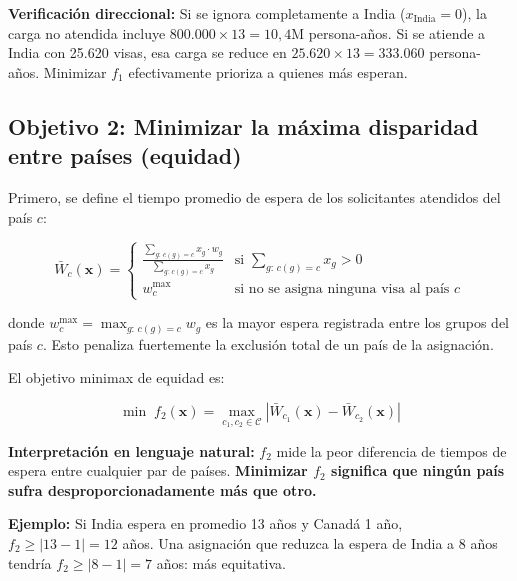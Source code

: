 \documentclass[12pt,letterpaper]{article}
\begin{document}
\textbf{Verificación direccional:} Si se ignora completamente a India ($x_{\text{India}} = 0$), la carga no atendida incluye $800.000 \times 13 = 10{,}4$M persona-años. Si se atiende a India con 25.620 visas, esa carga se reduce en $25.620 \times 13 = 333.060$ persona-años. Minimizar $f_1$ efectivamente prioriza a quienes más esperan. 

\subsection{Objetivo 2: Minimizar la máxima disparidad entre países (equidad)}

Primero, se define el tiempo promedio de espera de los solicitantes atendidos del país $c$:

\begin{formulabox}
\begin{equation}
\bar{W}_c(\mathbf{x}) = \begin{cases}
\displaystyle\frac{\sum_{g:\, c(g)=c} x_g \cdot w_g}{\sum_{g:\, c(g)=c} x_g} & \text{si } \sum_{g:\, c(g)=c} x_g > 0 \\[10pt]
w_c^{\max} & \text{si no se asigna ninguna visa al país } c
\end{cases}
\label{eq:wait_country_f2}
\end{equation}

donde $w_c^{\max} = \max_{g:\, c(g)=c} w_g$ es la mayor espera registrada entre los grupos del país $c$. Esto penaliza fuertemente la exclusión total de un país de la asignación.
\end{formulabox}

El objetivo minimax de equidad es:

\begin{formulabox}
\begin{equation}
\min \; f_2(\mathbf{x}) = \max_{c_1, c_2 \in \mathcal{C}} \left| \bar{W}_{c_1}(\mathbf{x}) - \bar{W}_{c_2}(\mathbf{x}) \right|
\label{eq:obj2_fase2}
\end{equation}
\end{formulabox}

\textbf{Interpretación en lenguaje natural:} $f_2$ mide la peor diferencia de tiempos de espera entre cualquier par de países. \textbf{Minimizar $f_2$ significa que ningún país sufra desproporcionadamente más que otro.}

\textbf{Ejemplo:} Si India espera en promedio 13 años y Canadá 1 año, $f_2 \geq |13 - 1| = 12$ años. Una asignación que reduzca la espera de India a 8 años tendría $f_2 \geq |8 - 1| = 7$ años: más equitativa.
\end{document}
